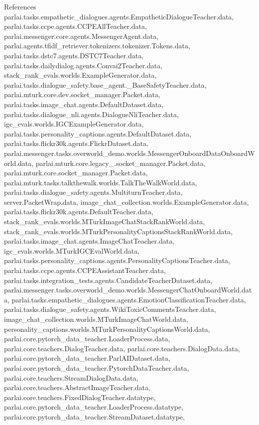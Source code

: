 References parlai.\+tasks.\+empathetic\+\_\+dialogues.\+agents.\+Empathetic\+Dialogue\+Teacher.\+data, parlai.\+tasks.\+ccpe.\+agents.\+C\+C\+P\+E\+All\+Teacher.\+data, parlai.\+messenger.\+core.\+agents.\+Messenger\+Agent.\+data, parlai.\+agents.\+tfidf\+\_\+retriever.\+tokenizers.\+tokenizer.\+Tokens.\+data, parlai.\+tasks.\+dstc7.\+agents.\+D\+S\+T\+C7\+Teacher.\+data, parlai.\+tasks.\+dailydialog.\+agents.\+Convai2\+Teacher.\+data, stack\+\_\+rank\+\_\+evals.\+worlds.\+Example\+Generator.\+data, parlai.\+tasks.\+dialogue\+\_\+safety.\+base\+\_\+agent.\+\_\+\+Base\+Safety\+Teacher.\+data, parlai.\+mturk.\+core.\+dev.\+socket\+\_\+manager.\+Packet.\+data, parlai.\+tasks.\+image\+\_\+chat.\+agents.\+Default\+Dataset.\+data, parlai.\+tasks.\+dialogue\+\_\+nli.\+agents.\+Dialogue\+Nli\+Teacher.\+data, igc\+\_\+evals.\+worlds.\+I\+G\+C\+Example\+Generator.\+data, parlai.\+tasks.\+personality\+\_\+captions.\+agents.\+Default\+Dataset.\+data, parlai.\+tasks.\+flickr30k.\+agents.\+Flickr\+Dataset.\+data, parlai.\+messenger.\+tasks.\+overworld\+\_\+demo.\+worlds.\+Messenger\+Onboard\+Data\+Onboard\+World.\+data, parlai.\+mturk.\+core.\+legacy\+\_.\+socket\+\_\+manager.\+Packet.\+data, parlai.\+mturk.\+core.\+socket\+\_\+manager.\+Packet.\+data, parlai.\+mturk.\+tasks.\+talkthewalk.\+worlds.\+Talk\+The\+Walk\+World.\+data, parlai.\+tasks.\+dialogue\+\_\+safety.\+agents.\+Multiturn\+Teacher.\+data, server.\+Packet\+Wrap.\+data, image\+\_\+chat\+\_\+collection.\+worlds.\+Example\+Generator.\+data, parlai.\+tasks.\+flickr30k.\+agents.\+Default\+Teacher.\+data, stack\+\_\+rank\+\_\+evals.\+worlds.\+M\+Turk\+Image\+Chat\+Stack\+Rank\+World.\+data, stack\+\_\+rank\+\_\+evals.\+worlds.\+M\+Turk\+Personality\+Captions\+Stack\+Rank\+World.\+data, parlai.\+tasks.\+image\+\_\+chat.\+agents.\+Image\+Chat\+Teacher.\+data, igc\+\_\+evals.\+worlds.\+M\+Turk\+I\+G\+C\+Eval\+World.\+data, parlai.\+tasks.\+personality\+\_\+captions.\+agents.\+Personality\+Captions\+Teacher.\+data, parlai.\+tasks.\+ccpe.\+agents.\+C\+C\+P\+E\+Assistant\+Teacher.\+data, parlai.\+tasks.\+integration\+\_\+tests.\+agents.\+Candidate\+Teacher\+Dataset.\+data, parlai.\+messenger.\+tasks.\+overworld\+\_\+demo.\+worlds.\+Messenger\+Chat\+Onboard\+World.\+data, parlai.\+tasks.\+empathetic\+\_\+dialogues.\+agents.\+Emotion\+Classification\+Teacher.\+data, parlai.\+tasks.\+dialogue\+\_\+safety.\+agents.\+Wiki\+Toxic\+Comments\+Teacher.\+data, image\+\_\+chat\+\_\+collection.\+worlds.\+M\+Turk\+Image\+Chat\+World.\+data, personality\+\_\+captions.\+worlds.\+M\+Turk\+Personality\+Captions\+World.\+data, parlai.\+core.\+pytorch\+\_\+data\+\_\+teacher.\+Loader\+Process.\+data, parlai.\+core.\+teachers.\+Dialog\+Teacher.\+data, parlai.\+core.\+teachers.\+Dialog\+Data.\+data, parlai.\+core.\+pytorch\+\_\+data\+\_\+teacher.\+Parl\+A\+I\+Dataset.\+data, parlai.\+core.\+pytorch\+\_\+data\+\_\+teacher.\+Pytorch\+Data\+Teacher.\+data, parlai.\+core.\+teachers.\+Stream\+Dialog\+Data.\+data, parlai.\+core.\+teachers.\+Abstract\+Image\+Teacher.\+data, parlai.\+core.\+teachers.\+Fixed\+Dialog\+Teacher.\+datatype, parlai.\+core.\+pytorch\+\_\+data\+\_\+teacher.\+Loader\+Process.\+datatype, parlai.\+core.\+pytorch\+\_\+data\+\_\+teacher.\+Stream\+Dataset.\+datatype, 